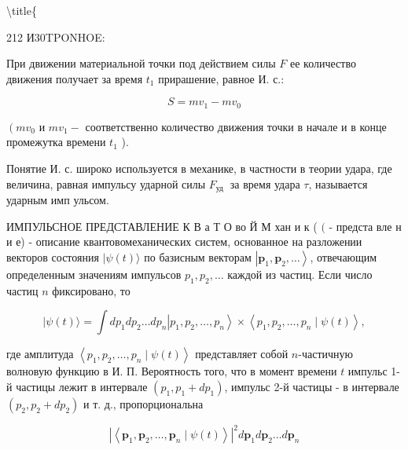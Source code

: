 \documentclass[10pt]{article}
\begin{document}
\textbackslash title\{



212 И30TPONHOE:



При движении материальной точки под действием силы $F$ ее количество движения получает за время $t_{1}$ прирашение, равное И. с.:



\[

S=m v_{1}-m v_{0}

\]



$\left(m v_{0}\right.$ и $m v_{1}-$ соответственно количество движения точки в начале и в конце промежутка времени $t_{1}$ ).



Понятие И. с. широко используется в механике, в частности в теории удара, где величина, равная импульсу ударной силы $F_{\text {уд }}$ за время удара $\tau$, называется ударным имп ульсом.



ИМПУЛЬСНОЕ ПРЕДСТАВЛЕНИЕ К В а Т О во Й М хан и к ( $($ - предста вле н и е) - описание квантовомеханических систем, основанное на разложении векторов состояния $|\psi(t)\rangle$ по базисным векторам $\left|\boldsymbol{p}_{1}, \boldsymbol{p}_{2}, \ldots\right\rangle$, отвечающим определенным значениям импульсов $p_{1}, p_{2}, \ldots$ каждой из частиц. Если число частиц $n$ фиксировано, то



\[

|\psi(t)\rangle=\int d p_{1} d p_{2} \ldots d p_{n}\left|p_{1}, p_{2}, \ldots, p_{n}\right\rangle \times\left\langle p_{1}, p_{2}, \ldots, p_{n} \mid \psi(t)\right\rangle,

\]



где амплитуда $\left\langle p_{1}, p_{2}, \ldots, p_{n} \mid \psi(t)\right\rangle$ представляет собой $n$-частичную волновую функцию в И. П. Вероятность того, что в момент времени $t$ импульс 1-й частицы лежит в интервале $\left(p_{1}, p_{1}+d p_{1}\right)$, импульс 2-й частицы - в интервале $\left(p_{2}, p_{2}+d p_{2}\right)$ и т. д., пропорциональна



\[

\left|\left\langle\boldsymbol{p}_{1}, \boldsymbol{p}_{2}, \ldots, \boldsymbol{p}_{n} \mid \psi(t)\right\rangle\right|^{2} d \boldsymbol{p}_{1} d \boldsymbol{p}_{2} \ldots d \boldsymbol{p}_{n}

\]
\end{document}
